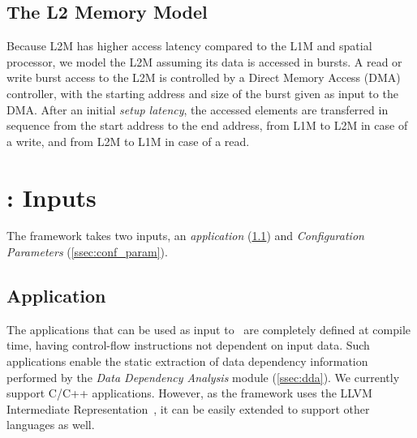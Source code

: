 

\vspace{-1mm}
\subsection{The L2 Memory Model}
\label{ssec:layer2_model}
\vspace{-1mm}
Because L2M has higher access latency compared to the L1M and spatial processor, we model the L2M assuming its data is accessed in bursts.
A read or write burst access to the L2M is controlled by a Direct Memory Access (DMA) controller, with the starting address and size of the burst given as input to the DMA. After an initial \textit{setup latency}, the accessed elements are transferred in sequence from the start address to the end address, from L1M to L2M in case of a write, and from L2M to L1M in case of a read.

\section{\frameworkname: Inputs}
The framework takes two inputs, an \textit{application} (\ref{ssec:app}) and \textit{Configuration Parameters} (\ref{ssec:conf_param}).
\vspace{-1mm}
\subsection{Application}
\label{ssec:app}
\vspace{-1mm}
The applications that can be used as input to \frameworkname~are completely defined at compile time, having control-flow instructions not dependent on input data. Such applications enable the static extraction of data dependency information performed by the \textit{Data Dependency Analysis} module (\ref{ssec:dda}). We currently support C/C++ applications. However, as the framework uses the LLVM Intermediate Representation~\cite{llvm}, it can be easily extended to support other languages as well.

